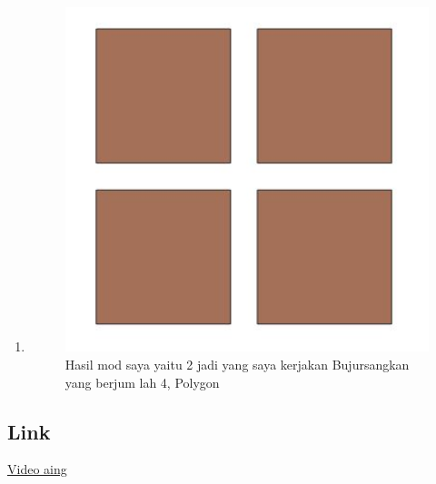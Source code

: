 \begin{enumerate}
	\item 
	
	\begin{figure}[H]
		\includegraphics[width=12cm]{figures/1174034/No10.JPG}
		\centering
		\caption{Hasil mod saya yaitu 2 jadi yang saya kerjakan Bujursangkan yang berjum lah 4, Polygon}
	\end{figure}	
\end{enumerate}

\subsection{Link}
 \href{https://youtu.be/JMjkDZIIx-o}{Video aing}